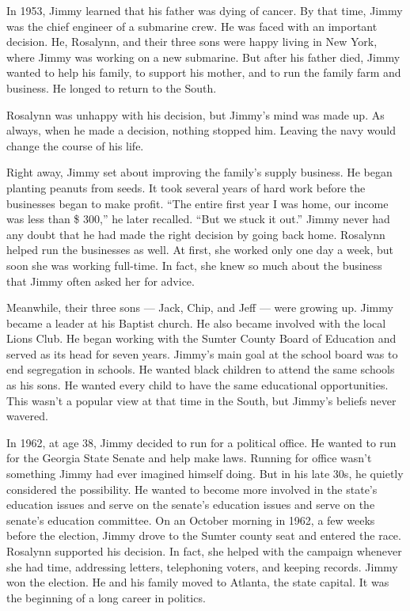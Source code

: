 \documentclass{article}
\begin{document}
In 1953, Jimmy learned that his father was dying of cancer. By that time, Jimmy was the chief engineer of a submarine crew. He was faced with an important decision. He, Rosalynn, and their three sons were happy living in New York, where Jimmy was working on a new submarine. But after his father died, Jimmy wanted to help his family, to support his mother, and to run the family farm and business. He longed to return to the South.

Rosalynn was unhappy with his decision, but Jimmy's mind was made up. As always, when he made a decision, nothing stopped him. Leaving the navy would change the course of his life.

Right away, Jimmy set about improving the family's supply business. He began planting peanuts from seeds. It took several years of hard work before the businesses began to make profit. ``The entire first year I was home, our income was less than \$ 300,'' he later recalled. ``But we stuck it out.'' Jimmy never had any doubt that he had made the right decision by going back home. Rosalynn helped run the businesses as well. At first, she worked only one day a week, but soon she was working full-time. In fact, she knew so much about the business that Jimmy often asked her for advice.

Meanwhile, their three sons --- Jack, Chip, and Jeff --- were growing up. Jimmy became a leader at his Baptist church. He also became involved with the local Lions Club. He began working with the Sumter County Board of Education and served as its head for seven years. Jimmy's main goal at the school board was to end segregation in schools. He wanted black children to attend the same schools as his sons. He wanted every child to have the same educational opportunities. This wasn't a popular view at that time in the South, but Jimmy's beliefs never wavered.

In 1962, at age 38, Jimmy decided to run for a political office. He wanted to run for the Georgia State Senate and help make laws. Running for office wasn't something Jimmy had ever imagined himself doing. But in his late 30s, he quietly considered the possibility. He wanted to become more involved in the state's education issues and serve on the senate's education issues and serve on the senate's education committee. On an October morning in 1962, a few weeks before the election, Jimmy drove to the Sumter county seat and entered the race. Rosalynn supported his decision. In fact, she helped with the campaign whenever she had time, addressing letters, telephoning voters, and keeping records. Jimmy won the election. He and his family moved to Atlanta, the state capital. It was the beginning of a long career in politics.
\end{document}
